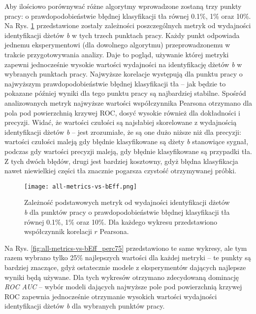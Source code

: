 Aby ilościowo porównywać różne algorytmy wprowadzone zostaną trzy punkty pracy: o prawdopodobieństwie błędnej klasyfikacji tła równej 0.1\%, 1\% oraz 10\%.
Na Rys. \ref{fig:all-metrics-vs-bEff} przedstawione zostały zależności poszczególnych metryk od wydajności identyfikacji dżetów \textit{b} w tych trzech punktach pracy. Każdy punkt odpowiada jednemu eksperymentowi (dla dowolnego algorytmu) przeprowadzonemu w trakcie przygotowywania analizy. Daje to pogląd, używanie której metryki zapewni jednocześnie wysokie wartości wydajności na identyfikację dżetów \textit{b} w wybranych punktach pracy. Najwyższe korelacje występują dla punktu pracy o najwyższym prawdopodobieństwie błędnej klasyfikacji tła -- jak będzie to pokazane później wyniki dla tego punktu pracy są najbardziej stabilne. Spośród analizowanych metryk najwyższe wartości współczynnika Pearsona otrzymano dla pola pod powierzchnią krzywej ROC, dosyć wysokie również dla dokładności i precyzji. Widać, że wartości czułości są najsłabiej skorelowane z wydajnością identyfikacji dżetów \textit{b} -- jest zrozumiałe, że są one dużo niższe niż dla precyzji: wartości czułości maleją gdy błędnie klasyfikowane są dżety \textit{b} stanowiące sygnał, podczas gdy wartości precyzji maleją, gdy błędnie klasyfikowane są przypadki tła. 
Z tych dwóch błędów, drugi jest bardziej kosztowny, gdyż błędna klasyfikacja nawet niewielkiej części tła znacznie pogarsza czystość otrzymywanej próbki.


\begin{figure}[h]
	\centering
	\texttt{[image: all-metrics-vs-bEff.png]}
	\caption{Zależność podstawowych metryk od wydajności identyfikacji dżetów \textit{b} dla punktów pracy o prawdopodobieństwie błędnej klasyfikacji tła równej 0.1\%, 1\% oraz 10\%. Dla każdego wykresu przedstawiono współczynnik korelacji $r$ Pearsona.}
	\label{fig:all-metrics-vs-bEff}
\end{figure}

Na Rys. \ref{fig:all-metrics-vs-bEff_perc75} przedstawiono te same wykresy, ale tym razem wybrano tylko 25\% najlepszych wartości dla każdej metryki -- te punkty są bardziej znaczące, gdyż ostatecznie modele z eksperymentów dających najlepsze wyniki będą używane.
Dla tych wykresów otrzymano zdecydowaną dominację \textit{ROC AUC} -- wybór modeli dających najwyższe pole pod powierzchnią krzywej ROC zapewnia jednocześnie otrzymanie wysokich wartości wydajności identyfikacji dżetów \textit{b} dla wybranych punktów pracy.

